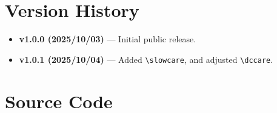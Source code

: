 \documentclass[luatex,fontsize=10pt,paper=b5,twoside]{jlreq}%
\begin{document}

\section{Version History}

\begin{itemize}
    \item \textbf{v1.0.0 (2025/10/03)} --- Initial public release.
    \item \textbf{v1.0.1 (2025/10/04)} --- Added \verb|\slowcare|, and adjusted \verb|\dccare|.
\end{itemize}

\section{Source Code}
\end{document}
